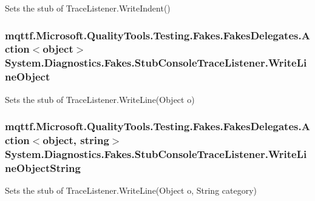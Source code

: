 Sets the stub of Trace\-Listener.\-Write\-Indent()

\hypertarget{class_system_1_1_diagnostics_1_1_fakes_1_1_stub_console_trace_listener_a40de8646092fef37436942df0c258a27}{
\subsubsection[{Write\-Line\-Object}]{\setlength{\rightskip}{0pt plus 5cm}mqttf.\-Microsoft.\-Quality\-Tools.\-Testing.\-Fakes.\-Fakes\-Delegates.\-Action$<$object$>$ System.\-Diagnostics.\-Fakes.\-Stub\-Console\-Trace\-Listener.\-Write\-Line\-Object}}\label{class_system_1_1_diagnostics_1_1_fakes_1_1_stub_console_trace_listener_a40de8646092fef37436942df0c258a27}


Sets the stub of Trace\-Listener.\-Write\-Line(\-Object o)

\hypertarget{class_system_1_1_diagnostics_1_1_fakes_1_1_stub_console_trace_listener_a6ec0970fc9b34384f08e9f5ccda591e4}{
\subsubsection[{Write\-Line\-Object\-String}]{\setlength{\rightskip}{0pt plus 5cm}mqttf.\-Microsoft.\-Quality\-Tools.\-Testing.\-Fakes.\-Fakes\-Delegates.\-Action$<$object, string$>$ System.\-Diagnostics.\-Fakes.\-Stub\-Console\-Trace\-Listener.\-Write\-Line\-Object\-String}}\label{class_system_1_1_diagnostics_1_1_fakes_1_1_stub_console_trace_listener_a6ec0970fc9b34384f08e9f5ccda591e4}


Sets the stub of Trace\-Listener.\-Write\-Line(\-Object o, String category)

